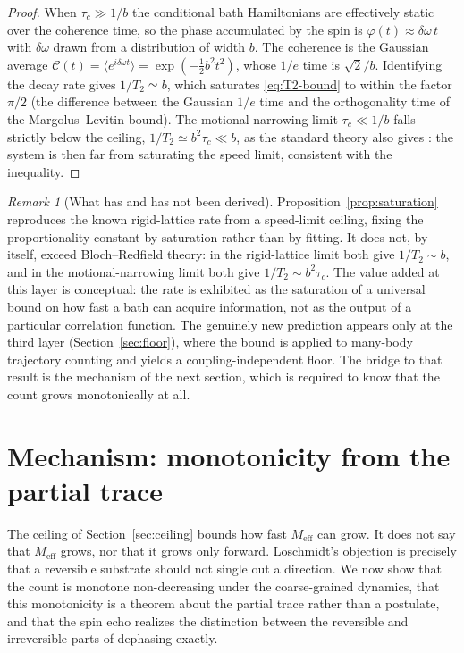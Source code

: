 \documentclass[twocolumn,10pt,a4paper]{article}
\theoremstyle{thmstyle}
\theoremstyle{definition}
\theoremstyle{remark}
\newtheorem{remark}[theorem]{Remark}
\newcommand{\Meff}{M_{\mathrm{eff}}}
\newcommand{\Ttwo}{T_{2}}
\begin{document}
\begin{proof}
When $\tau_{c}\gg 1/b$ the conditional bath Hamiltonians are effectively
static over the coherence time, so the phase accumulated by the spin is
$\varphi(t)\approx\delta\omega\,t$ with $\delta\omega$ drawn from a
distribution of width $b$. The coherence is the Gaussian average
$\mathcal{C}(t)=\langle e^{i\delta\omega t}\rangle
=\exp(-\tfrac12 b^{2}t^{2})$, whose $1/e$ time is
$\sqrt{2}/b$. Identifying the decay rate gives $1/\Ttwo\simeq b$, which
saturates \eqref{eq:T2-bound} to within the factor $\pi/2$ (the difference
between the Gaussian $1/e$ time and the orthogonality time of the
Margolus--Levitin bound). The motional-narrowing limit $\tau_{c}\ll 1/b$
falls strictly below the ceiling, $1/\Ttwo\simeq b^{2}\tau_{c}\ll b$, as
the standard theory also gives \citep{kubo1962}: the system is then far
from saturating the speed limit, consistent with the inequality.
\end{proof}

\begin{remark}[What has and has not been derived]
\label{rem:ceiling-status}
Proposition~\ref{prop:saturation} reproduces the known rigid-lattice rate
from a speed-limit ceiling, fixing the proportionality constant by
saturation rather than by fitting. It does not, by itself, exceed
Bloch--Redfield theory: in the rigid-lattice limit both give $1/\Ttwo\sim
b$, and in the motional-narrowing limit both give $1/\Ttwo\sim
b^{2}\tau_{c}$. The value added at this layer is conceptual: the rate is
exhibited as the saturation of a universal bound on how fast a bath can
acquire information, not as the output of a particular correlation
function. The genuinely new prediction appears only at the third layer
(Section~\ref{sec:floor}), where the bound is applied to many-body
trajectory counting and yields a coupling-independent floor. The bridge to
that result is the mechanism of the next section, which is required to
know that the count grows monotonically at all.
\end{remark}

\section{Mechanism: monotonicity from the partial trace}
\label{sec:mechanism}

The ceiling of Section~\ref{sec:ceiling} bounds how fast $\Meff$ can grow.
It does not say that $\Meff$ grows, nor that it grows only forward.
Loschmidt's objection is precisely that a reversible substrate should not
single out a direction. We now show that the count is monotone
non-decreasing under the coarse-grained dynamics, that this monotonicity
is a theorem about the partial trace rather than a postulate, and that the
spin echo realizes the distinction between the reversible and irreversible
parts of dephasing exactly.
\end{document}
